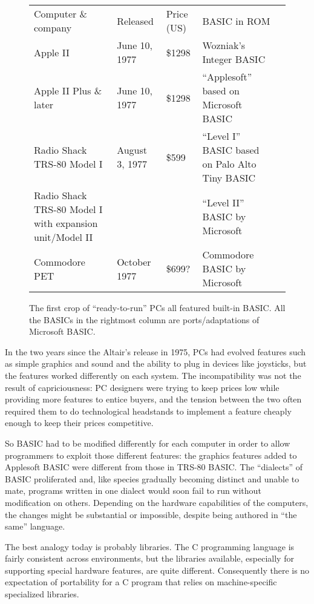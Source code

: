 \begin{figure}
  \begin{tabular}{|l|l|l|l|l|}
  \hline
  Computer \& company 
  & Released 
  & Price (US) 
  & BASIC in ROM
  \\
  Apple II
  & June 10, 1977 
  & \$1298 
  & Wozniak's Integer BASIC 
  \\
  Apple II Plus \& later
  & June 10, 1977 
  & \$1298 
  & ``Applesoft'' based on Microsoft BASIC
  \\
  Radio Shack TRS-80 Model I
  & August 3, 1977 
  &   \$599 
  & ``Level I'' BASIC based on Palo Alto Tiny BASIC
  \\
  Radio Shack TRS-80 Model I with expansion unit/Model II
  & 
  & 
  & ``Level II'' BASIC by Microsoft
  \\
  Commodore PET
  & October 1977 
  & \$699? 
  & Commodore BASIC by Microsoft
  \\
  \end{tabular}
  \caption{\label{fig:timeline} The first crop of ``ready-to-run'' PCs
    all featured built-in BASIC.  All the BASICs in the rightmost column
    are ports/adaptations of Microsoft BASIC.}
\end{figure}

In the two years since the Altair's release in 1975, PCs had evolved 
features such as simple graphics
and sound and the ability to plug in devices like joysticks, but the
features worked differently on each system.  The incompatibility was not
the result of capriciousness: PC designers were trying to keep prices
low while providing more features to entice buyers, and the tension
between the two often required them to do technological headstands to
implement a feature cheaply enough to keep their prices competitive.

So BASIC had to be modified differently for each computer in order to
allow programmers to exploit those different features: the graphics
features added to Applesoft BASIC were different from those in TRS-80
BASIC.
  The
``dialects'' of BASIC proliferated and, like species gradually becoming
distinct and unable to mate, programs written in one dialect would soon
fail to run without modification on others.  Depending on the hardware
capabilities of the computers, the changes might be substantial or
impossible,
despite being authored in ``the same'' language.

\begin{tangent}
The best analogy today is probably libraries.  The C programming
language is fairly consistent across environments, but the libraries
available, especially for supporting special hardware features, are
quite different.  Consequently there is no expectation of portability
for a C program 
that relies on machine-specific specialized libraries.
\end{tangent}

